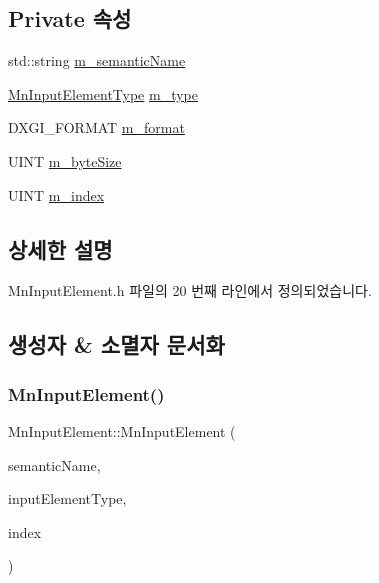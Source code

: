 \subsection*{Private 속성}
\begin{DoxyCompactItemize}
\item 
std\+::string \hyperlink{class_m_n_l_1_1_mn_input_element_add6831c8eac59037aea8ab7f0ad590ca}{m\+\_\+semantic\+Name}
\item 
\hyperlink{namespace_m_n_l_a8605571a36b2bb477280767d71fe6f9e}{Mn\+Input\+Element\+Type} \hyperlink{class_m_n_l_1_1_mn_input_element_a8c81b40be5e4108e7473b0589e0da8f5}{m\+\_\+type}
\item 
D\+X\+G\+I\+\_\+\+F\+O\+R\+M\+AT \hyperlink{class_m_n_l_1_1_mn_input_element_a6c247125236a7166fdbf1a7dca654f51}{m\+\_\+format}
\item 
U\+I\+NT \hyperlink{class_m_n_l_1_1_mn_input_element_a8a93b5979d9bc94600a979811532366f}{m\+\_\+byte\+Size}
\item 
U\+I\+NT \hyperlink{class_m_n_l_1_1_mn_input_element_ad75d411d62b10a84eb494c948fee379d}{m\+\_\+index}
\end{DoxyCompactItemize}


\subsection{상세한 설명}


Mn\+Input\+Element.\+h 파일의 20 번째 라인에서 정의되었습니다.



\subsection{생성자 \& 소멸자 문서화}
\mbox{\label{class_m_n_l_1_1_mn_input_element_a0a2c66ec037982166078a9d6d2318aa2}} 
\subsubsection{\texorpdfstring{Mn\+Input\+Element()}{MnInputElement()}\hspace{0.1cm}{\footnotesize\ttfamily [1/2]}}
{\footnotesize\ttfamily Mn\+Input\+Element\+::\+Mn\+Input\+Element (\begin{DoxyParamCaption}\item[{std\+::string}]{semantic\+Name,  }\item[{const \hyperlink{namespace_m_n_l_a8605571a36b2bb477280767d71fe6f9e}{Mn\+Input\+Element\+Type} \&}]{input\+Element\+Type,  }\item[{U\+I\+NT}]{index }\end{DoxyParamCaption})}



